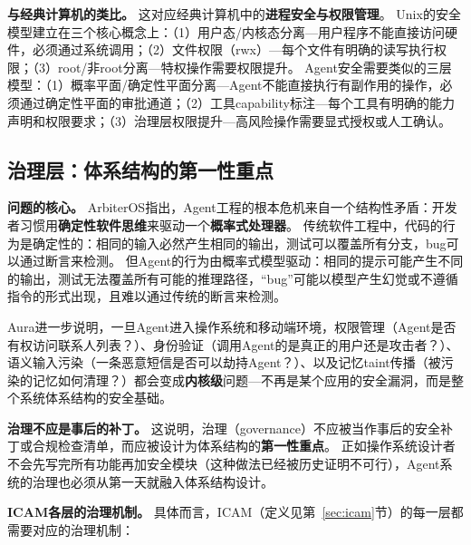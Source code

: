 \textbf{与经典计算机的类比。}
这对应经典计算机中的\textbf{进程安全与权限管理}。
Unix的安全模型建立在三个核心概念上：（1）用户态/内核态分离---用户程序不能直接访问硬件，必须通过系统调用\cite{ostep_2023}；（2）文件权限（rwx）---每个文件有明确的读写执行权限；（3）root/非root分离---特权操作需要权限提升。
Agent安全需要类似的三层模型：（1）概率平面/确定性平面分离---Agent不能直接执行有副作用的操作，必须通过确定性平面的审批通道；（2）工具capability标注---每个工具有明确的能力声明和权限要求；（3）治理层权限提升---高风险操作需要显式授权或人工确认。

\subsection{治理层：体系结构的第一性重点}

\textbf{问题的核心。}
ArbiterOS\cite{arbiteros2025}指出，Agent工程的根本危机来自一个结构性矛盾：开发者习惯用\textbf{确定性软件思维}来驱动一个\textbf{概率式处理器}。
传统软件工程中，代码的行为是确定性的：相同的输入必然产生相同的输出，测试可以覆盖所有分支，bug可以通过断言来检测。
但Agent的行为由概率式模型驱动：相同的提示可能产生不同的输出，测试无法覆盖所有可能的推理路径，``bug''可能以模型产生幻觉或不遵循指令的形式出现，且难以通过传统的断言来检测。

Aura\cite{aura2025}进一步说明，一旦Agent进入操作系统和移动端环境，权限管理（Agent是否有权访问联系人列表？）、身份验证（调用Agent的是真正的用户还是攻击者？）、语义输入污染（一条恶意短信是否可以劫持Agent？）、以及记忆taint传播（被污染的记忆如何清理？）都会变成\textbf{内核级}问题---不再是某个应用的安全漏洞，而是整个系统体系结构的安全基础。

\textbf{治理不应是事后的补丁。}
这说明，治理（governance）不应被当作事后的安全补丁或合规检查清单，而应被设计为体系结构的\textbf{第一性重点}。
正如操作系统设计者不会先写完所有功能再加安全模块（这种做法已经被历史证明不可行\cite{ostep_2023}），Agent系统的治理也必须从第一天就融入体系结构设计。

\textbf{ICAM各层的治理机制。}
具体而言，ICAM（定义见第~\ref{sec:icam}节）的每一层都需要对应的治理机制：

